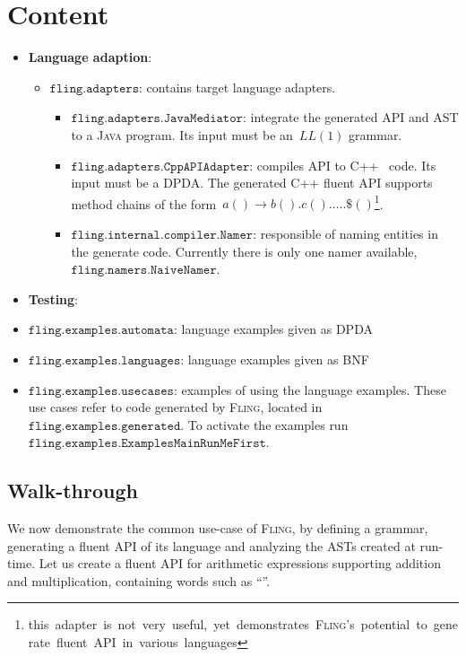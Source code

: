 \documentclass[a4paper,UKenglish,cleveref, autoref]{darts-v2019}
\newcommand{\Fling}{F\textsc{ling}\xspace}
\DeclareRobustCommand{\tt}[1]{{\ensuremath{\texttt{#1}}}}
\newcommand{\Java}{\textsc{Java}\xspace}
\newcommand{\CC}{\textsc{C++}\xspace}
\providecommand\cc[1]{\textcolor{Sepia}{\text{\textup{\textbf{\texttt{#1}}}}}}
\newenvironment{content}{\section{Content}}{}
\begin{document}
\begin{content}
\begin{itemize}
	\item \textbf{Language adaption}:
	\begin{itemize}
		\item \tt{fling.adapters}: contains target language adapters.
		\begin{itemize}
      \item \tt{fling.adapters.JavaMediator}: integrate the generated API and
        AST to a \Java program.  Its input must be an~$LL(1)$ grammar.
      \item \tt{fling.adapters.CppAPIAdapter}: compiles API to \CC~\cite{Stroustrup:Book:97} code. Its
        input must be a DPDA.  The generated \CC fluent API supports method
        chains of the form~\mbox{$a()\rightarrow b().c().\ldots.\$()$\footnote{
			this adapter is not very useful, yet demonstrates \Fling's potential to generate fluent API in various
		languages}}.
		\item \tt{fling.internal.compiler.Namer}: responsible of naming entities in the generate code.
		Currently there is only one namer available, \tt{fling.namers.NaiveNamer}.
		\end{itemize}
	\end{itemize}
	\item \textbf{Testing}:
		\item \tt{fling.examples.automata}: language examples given as DPDA
		\item \tt{fling.examples.languages}: language examples given as BNF
		\item \tt{fling.examples.usecases}: examples of using the language examples.
		These use cases refer to code generated by \Fling, located in \tt{fling.examples.generated}.
		To activate the examples run \tt{fling.examples.ExamplesMainRunMeFirst}.
\end{itemize}

\subsection{Walk-through}

We now demonstrate the common use-case of \Fling, by defining
a grammar, generating a fluent API of its language and analyzing
the ASTs created at run-time.
Let us create a fluent API for arithmetic expressions supporting addition
and multiplication, containing words such as ``\cc{2 * (3 + 4)}''.

\begin{enumerate}
	

\end{enumerate}
\end{content}
\end{document}
